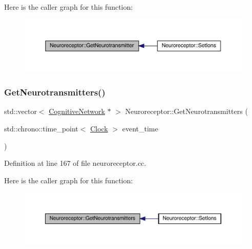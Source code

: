 Here is the caller graph for this function\+:\nopagebreak
\begin{figure}[H]
\begin{center}
\leavevmode
\includegraphics[width=350pt]{class_neuroreceptor_a526d41738265399c19c67068db450851_icgraph}
\end{center}
\end{figure}
\mbox{\label{class_neuroreceptor_a4267220ee11105b7628bf39049ef7cc5}} 
\subsubsection{\texorpdfstring{Get\+Neurotransmitters()}{GetNeurotransmitters()}}
{\footnotesize\ttfamily std\+::vector$<$ \hyperlink{class_cognitive_network}{Cognitive\+Network} $\ast$ $>$ Neuroreceptor\+::\+Get\+Neurotransmitters (\begin{DoxyParamCaption}\item[{std\+::chrono\+::time\+\_\+point$<$ \hyperlink{universe_8h_a0ef8d951d1ca5ab3cfaf7ab4c7a6fd80}{Clock} $>$}]{event\+\_\+time }\end{DoxyParamCaption})}



Definition at line 167 of file neuroreceptor.\+cc.

Here is the caller graph for this function\+:\nopagebreak
\begin{figure}[H]
\begin{center}
\leavevmode
\includegraphics[width=350pt]{class_neuroreceptor_a4267220ee11105b7628bf39049ef7cc5_icgraph}
\end{center}
\end{figure}
\mbox{\label{class_neuroreceptor_afbcf31596170f09292e4d8057c0215e8}} 

